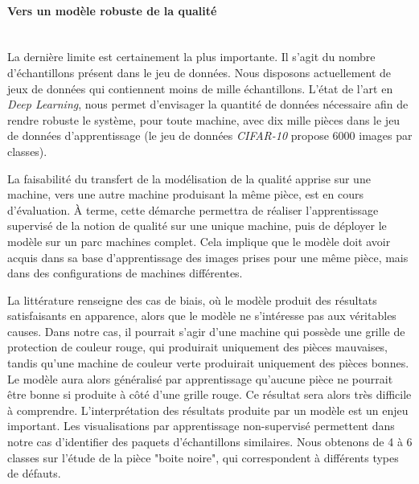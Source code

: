 \paragraph{Vers un modèle robuste de la qualité} \mbox{} \\
La dernière limite est certainement la plus importante.
Il s'agit du nombre d'échantillons présent dans le jeu de données.
Nous disposons actuellement de jeux de données qui contiennent moins de mille échantillons.
L’état de l’art en \textit{Deep Learning}, nous permet d’envisager la quantité de données nécessaire afin de rendre robuste le système, pour toute machine, avec dix mille pièces dans le jeu de données d’apprentissage (le jeu de données \textit{CIFAR-10} \cite{krizhevsky2009learning} propose 6000 images par classes).

La faisabilité du transfert de la modélisation de la qualité apprise sur une machine, vers une autre machine produisant la même pièce, est en cours d’évaluation.
À terme, cette démarche permettra de réaliser l’apprentissage supervisé de la notion de qualité sur une unique machine, puis de déployer le modèle sur un parc machines complet.
Cela implique que le modèle doit avoir acquis dans sa base d’apprentissage des images prises pour une même pièce, mais dans des configurations de machines différentes.

La littérature renseigne des cas de biais, où le modèle produit des résultats satisfaisants en apparence, alors que le modèle ne s’intéresse pas aux véritables causes.
Dans notre cas, il pourrait s'agir d'une machine qui possède une grille de protection de couleur rouge, qui produirait uniquement des pièces mauvaises, tandis qu’une machine de couleur verte produirait uniquement des pièces bonnes.
Le modèle aura alors généralisé par apprentissage qu’aucune pièce ne pourrait être bonne si produite à côté d’une grille rouge.
Ce résultat sera alors très difficile à comprendre.
L'interprétation des résultats produite par un modèle est un enjeu important.
Les visualisations par apprentissage non-supervisé permettent dans notre cas d'identifier des paquets d'échantillons similaires.
Nous obtenons de 4 à 6 classes sur l'étude de la pièce "boite noire", qui correspondent à différents types de défauts.

